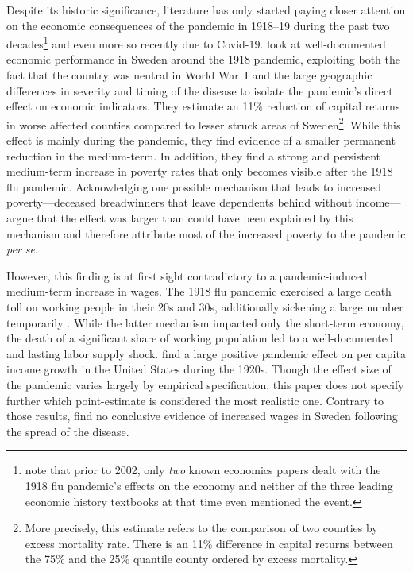 \documentclass[12pt,a4paper]{article}
\begin{document}
Despite its historic significance, literature has only started paying closer attention on the economic consequences of the pandemic in 1918--19 during the past two decades\footnote{\cite{brainerdEconomicEffects19182003} note that prior to 2002, only \textit{two} known economics papers dealt with the 1918 flu pandemic's effects on the economy and neither of the three leading economic history textbooks at that time even mentioned the event.} and even more so recently due to Covid-19.
\cite{karlssonImpact1918Spanish2014} look at well-documented economic performance in Sweden around the 1918 pandemic, exploiting both the fact that the country was neutral in World War~I and the large geographic differences in severity and timing of the disease to isolate the pandemic's direct effect on economic indicators.
They estimate an 11\% reduction of capital returns in worse affected counties compared to lesser struck areas of Sweden\footnote{More precisely, this estimate refers to the comparison of two counties by excess mortality rate. There is an 11\% difference in capital returns between the 75\% and the 25\% quantile county ordered by excess mortality.}.
While this effect is mainly during the pandemic, they find evidence of a smaller permanent reduction in the medium-term.
In addition, they find a strong and persistent medium-term increase in poverty rates that only becomes visible after the 1918 flu pandemic.
Acknowledging one possible mechanism that leads to increased poverty---deceased breadwinners that leave dependents behind without income---\cite{karlssonImpact1918Spanish2014} argue that the effect was larger than could have been explained by this mechanism and therefore attribute most of the increased poverty to the pandemic \textit{per se}.

However, this finding is at first sight contradictory to a pandemic-induced medium-term increase in wages.
The 1918 flu pandemic exercised a large death toll on working people in their 20s and 30s, additionally sickening a large number temporarily \citep{taubenberger1918InfluenzaMother2006}. 
While the latter mechanism impacted only the short-term economy,
the death of a significant share of working population led to a well-documented and lasting labor supply shock.
\cite{brainerdEconomicEffects19182003} find a large positive pandemic effect on per capita income growth in the United States during the 1920s.
Though the effect size of the pandemic varies largely by empirical specification, this paper does not specify further which point-estimate is considered the most realistic one.
Contrary to those results, \cite{karlssonImpact1918Spanish2014} find no conclusive evidence of increased wages in Sweden following the spread of the disease.
\end{document}
